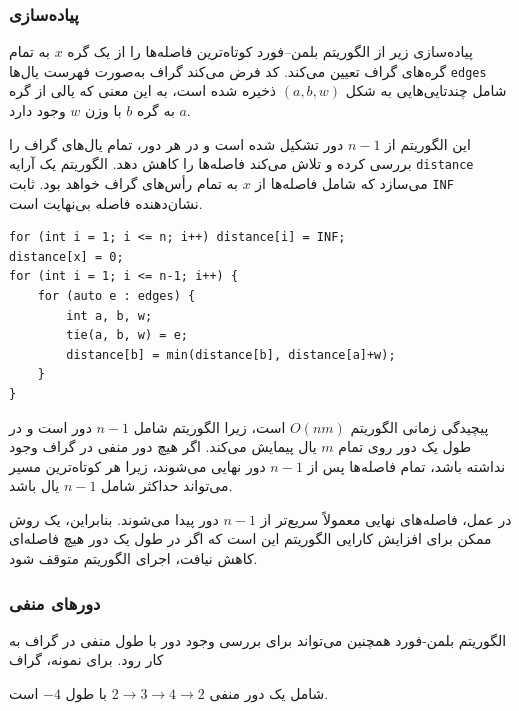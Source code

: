 \subsubsection{پیاده‌سازی}

پیاده‌سازی زیر از الگوریتم بلمن–فورد
کوتاه‌ترین فاصله‌ها را از یک گره $x$ به تمام گره‌های گراف تعیین می‌کند.
کد فرض می‌کند گراف به‌صورت فهرست یال‌ها \texttt{edges}
شامل چندتایی‌هایی به شکل $(a,b,w)$ ذخیره شده است،
به این معنی که یالی از گره $a$ به گره $b$ با وزن $w$ وجود دارد.

این الگوریتم از $n-1$ دور تشکیل شده است
و در هر دور، تمام یال‌های گراف را بررسی کرده
و تلاش می‌کند فاصله‌ها را کاهش دهد.
الگوریتم یک آرایه \texttt{distance} می‌سازد
که شامل فاصله‌ها از $x$ به تمام رأس‌های گراف خواهد بود.
ثابت \texttt{INF} نشان‌دهنده فاصله بی‌نهایت است.

\begin{lstlisting}
for (int i = 1; i <= n; i++) distance[i] = INF;
distance[x] = 0;
for (int i = 1; i <= n-1; i++) {
    for (auto e : edges) {
        int a, b, w;
        tie(a, b, w) = e;
        distance[b] = min(distance[b], distance[a]+w);
    }
}
\end{lstlisting}

پیچیدگی زمانی الگوریتم $O(nm)$ است،
زیرا الگوریتم شامل $n-1$ دور است و
در طول یک دور روی تمام $m$ یال پیمایش می‌کند.
اگر هیچ دور منفی در گراف وجود نداشته باشد،
تمام فاصله‌ها پس از $n-1$ دور نهایی می‌شوند،
زیرا هر کوتاه‌ترین مسیر می‌تواند حداکثر شامل $n-1$ یال باشد.

در عمل، فاصله‌های نهایی معمولاً
سریع‌تر از $n-1$ دور پیدا می‌شوند.
بنابراین، یک روش ممکن برای افزایش کارایی الگوریتم
این است که اگر در طول یک دور هیچ فاصله‌ای کاهش نیافت،
اجرای الگوریتم متوقف شود.

\subsubsection{دورهای منفی}


الگوریتم بلمن-فورد همچنین می‌تواند برای
بررسی وجود دور با طول منفی در گراف به کار رود.
برای نمونه، گراف

\begin{center}
\end{center}
\noindent
شامل یک دور منفی
$2 \rightarrow 3 \rightarrow 4 \rightarrow 2$
با طول $-4$ است.

